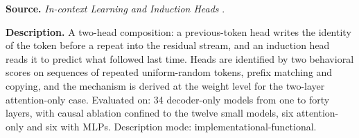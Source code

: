 
\textbf{Source.} \emph{In-context Learning and Induction Heads} \citep{olsson2022context}.

\textbf{Description.} A two-head composition: a previous-token head writes the identity of the token before a repeat into the residual stream, and an induction head reads it to predict what followed last time. Heads are identified by two behavioral scores on sequences of repeated uniform-random tokens, prefix matching and copying, and the mechanism is derived at the weight level for the two-layer attention-only case. Evaluated on: 34 decoder-only models from one to forty layers, with causal ablation confined to the twelve small models, six attention-only and six with MLPs. Description mode: implementational-functional.

